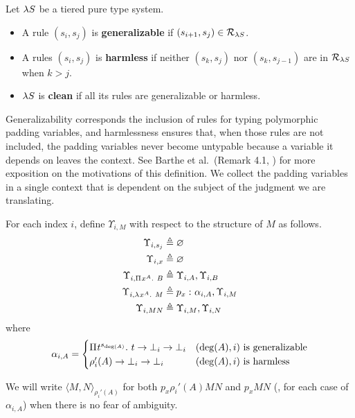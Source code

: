 \documentclass{article}
\begin{document}
\begin{definition}
Let $\lambda S$ be a tiered pure type system.
\begin{itemize}
    \item A rule $(s_i, s_j)$ is \textbf{generalizable} if $(s_{i + 1}, s_j) \in \mathcal R_{\lambda S}$.
    \item A rules $(s_i, s_j)$ is \textbf{harmless} if neither $(s_k, s_j)$ nor $(s_k, s_{j - 1})$ are in $\mathcal R_{\lambda S}$ when $k > j$.
    \item $\lambda S$ is \textbf{clean} if all its rules are generalizable or harmless.
\end{itemize}
\end{definition}

Generalizability corresponds the inclusion of rules for typing polymorphic padding variables, and harmlessness ensures that, when those rules are not included, the padding variables never become untypable because a variable it depends on leaves the context.
See Barthe et al.\ (Remark 4.1, \cite{barthe-et-al-2001}) for more exposition on the motivations of this definition.
We collect the padding variables in a single context that is dependent on the subject of the judgment we are translating.

\begin{definition}
For each index $i$, define $\Upsilon_{i, M}$ with respect to the structure of $M$ as follows.
\begin{align*}
    \Upsilon_{i, s_j} &\triangleq \varnothing \\
    \Upsilon_{i, x} &\triangleq \varnothing \\
    \Upsilon_{i, {\Pi^{} {x}^{A}. \ {B}}} &\triangleq \Upsilon_{i, A}, \Upsilon_{i, B} \\
    \Upsilon_{i, \lambda^{} x^{A}. \ M} &\triangleq {{p_x} :^{} {\alpha_{i, A}}}, \Upsilon_{i, M} \\
    \Upsilon_{i, MN} &\triangleq \Upsilon_{i, M}, \Upsilon_{i, N}
\end{align*}
where
\[
\alpha_{i, A} =
\begin{cases}
    {\Pi^{} {t}^{s_{\deg(A)}}. \ {t \to \bot_i \to \bot_i}} & \textnormal{$(\deg(A), i)$ is generalizable} \\
    \rho_i'(A) \to \bot_i \to \bot_i & \textnormal{$(\deg(A), i)$ is harmless}
\end{cases}
\]
\end{definition}

\newcommand{\pair}[3][]{\langle#2, #3\rangle_{#1}}
We will write $\pair[\rho_i'(A)] M N$ for both $p_x \rho_i'(A) M N$ and $p_x M N$ (\ie, for each case of $\alpha_{i , A}$) when there is no fear of ambiguity.
\end{document}

